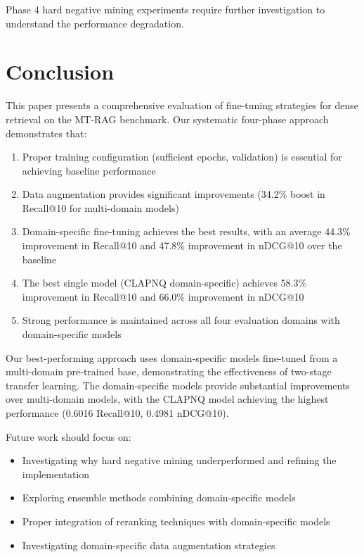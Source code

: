 \documentclass[conference]{IEEEtran}
\begin{document}
Phase 4 hard negative mining experiments require further investigation to understand the performance degradation.

\section{Conclusion}

This paper presents a comprehensive evaluation of fine-tuning strategies for dense retrieval on the MT-RAG benchmark. Our systematic four-phase approach demonstrates that:

\begin{enumerate}
    \item Proper training configuration (sufficient epochs, validation) is essential for achieving baseline performance
    \item Data augmentation provides significant improvements (34.2\% boost in Recall@10 for multi-domain models)
    \item Domain-specific fine-tuning achieves the best results, with an average 44.3\% improvement in Recall@10 and 47.8\% improvement in nDCG@10 over the baseline
    \item The best single model (CLAPNQ domain-specific) achieves 58.3\% improvement in Recall@10 and 66.0\% improvement in nDCG@10
    \item Strong performance is maintained across all four evaluation domains with domain-specific models
\end{enumerate}

Our best-performing approach uses domain-specific models fine-tuned from a multi-domain pre-trained base, demonstrating the effectiveness of two-stage transfer learning. The domain-specific models provide substantial improvements over multi-domain models, with the CLAPNQ model achieving the highest performance (0.6016 Recall@10, 0.4981 nDCG@10).

Future work should focus on:
\begin{itemize}
    \item Investigating why hard negative mining underperformed and refining the implementation
    \item Exploring ensemble methods combining domain-specific models
    \item Proper integration of reranking techniques with domain-specific models
    \item Investigating domain-specific data augmentation strategies
\end{itemize}
\end{document}
